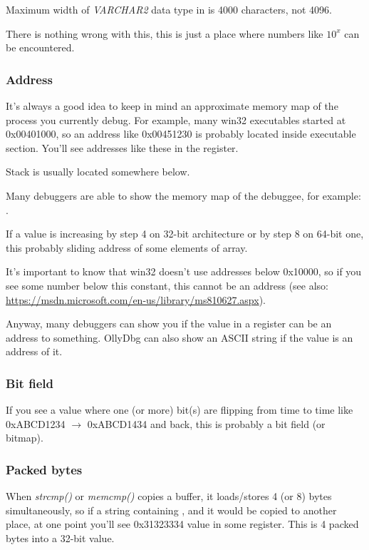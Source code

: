 Maximum width of \emph{VARCHAR2} data type in \oracle is 4000 characters, not 4096.

There is nothing wrong with this, this is just a place where numbers like $10^x$ can be encountered.

\subsubsection{Address}

It's always a good idea to keep in mind an approximate memory map of the process you currently debug.
For example, many win32 executables started at 0x00401000, so an address like 0x00451230 is probably located inside
executable section. You'll see addresses like these in the  register.

Stack is usually located somewhere below. %

Many debuggers are able to show the memory map of the debuggee, for example: .

If a value is increasing by step 4 on 32-bit architecture or by step 8 on 64-bit one,
this probably sliding address of some elements of array.

It's important to know that win32 doesn't use addresses below 0x10000, so if you see some number below this constant,
this cannot be an address (see also: \url{https://msdn.microsoft.com/en-us/library/ms810627.aspx}).

Anyway, many debuggers can show you if the value in a register can be an address to something.
OllyDbg can also show an ASCII string if the value is an address of it.

\subsubsection{Bit field}

If you see a value where one (or more) bit(s) are flipping from time to time like 0xABCD1234 $\rightarrow$ 0xABCD1434 and back,
this is probably a bit field (or bitmap).

\subsubsection{Packed bytes}

When \emph{strcmp()} or \emph{memcmp()} copies a buffer, it loads/stores 4 (or 8) bytes simultaneously,
so if a string containing , and it would be copied to another place,
at one point you'll see 0x31323334 value in some register.
This is 4 packed bytes into a 32-bit value.

